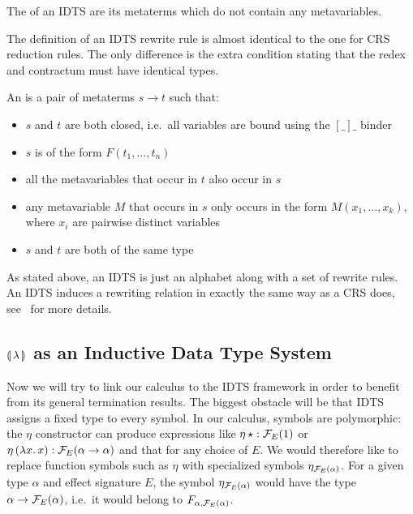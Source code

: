 \begin{definition}
  The  of an IDTS are its metaterms which do not contain any
  metavariables.
\end{definition}

The definition of an IDTS rewrite rule is almost identical to the one for
CRS reduction rules. The only difference is the extra condition stating
that the redex and contractum must have identical types.

\begin{definition}
  An  is a pair of metaterms $s \to t$ such that:
  \begin{itemize}
  \item $s$ and $t$ are both closed, i.e.\ all variables are bound using
    the $[\_]\_$ binder
  \item $s$ is of the form $F(t_1,\ldots,t_n)$
  \item all the metavariables that occur in $t$ also occur in $s$
  \item any metavariable $M$ that occurs in $s$ only occurs in the form
    $M(x_1,\ldots,x_k)$, where $x_i$ are pairwise distinct variables
  \item $s$ and $t$ are both of the same type
  \end{itemize}
\end{definition}

As stated above, an IDTS is just an alphabet along with a set of rewrite
rules. An IDTS induces a rewriting relation in exactly the same way as a
CRS does, see~\cite{blanqui2000termination} for more details.


\subsection{$\llparenthesis \, \lambda \, \rrparenthesis$ as an Inductive Data Type System}
\label{ssec:banana-idts}

Now we will try to link our calculus to the IDTS framework in order to
benefit from its general termination results. The biggest obstacle will be
that IDTS assigns a fixed type to every symbol. In our calculus, symbols
are polymorphic: the $\eta$ constructor can produce expressions like
$\eta\,\star : \mathcal{F}_E(1)$ or $\eta\,(\lambda x.\, x) : \mathcal{F}_E(\alpha \to
\alpha)$ and that for any choice of $E$. We would therefore like to replace
function symbols such as $\eta$ with specialized symbols
$\eta_{\mathcal{F}_E(\alpha)}$. For a given type $\alpha$ and effect signature $E$,
the symbol $\eta_{\mathcal{F}_E(\alpha)}$ would have the type $\alpha \to
\mathcal{F}_E(\alpha)$, i.e.\ it would belong to $F_{\alpha,\mathcal{F}_E(\alpha)}$.


